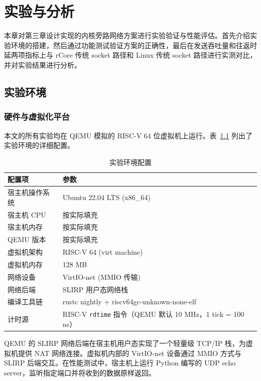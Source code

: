 \chapter{实验与分析}
\label{cha:experiment}

本章对第三章设计实现的内核旁路网络方案进行实验验证与性能评估。首先介绍实验环境的搭建，然后通过功能测试验证方案的正确性，最后在发送吞吐量和往返时延两项指标上与 rCore 传统 socket 路径和 Linux 传统 socket 路径进行实测对比，并对实验结果进行分析。

\section{实验环境}
\label{sec:env}

\subsection{硬件与虚拟化平台}

本文的所有实验均在 QEMU 模拟的 RISC-V 64 位虚拟机上运行。表~\ref{tab:env} 列出了实验环境的详细配置。

\begin{table}[htbp]
    \centering
    \caption{实验环境配置}
    \label{tab:env}
    \begin{tabular}{ll}
        \toprule
        配置项 & 参数 \\
        \midrule
        宿主机操作系统   & Ubuntu 22.04 LTS (x86\_64) \\
        宿主机 CPU       & 按实际填充 \\
        宿主机内存       & 按实际填充 \\
        QEMU 版本        & 按实际填充 \\
        虚拟机架构       & RISC-V 64 (virt machine) \\
        虚拟机内存       & 128 MB \\
        网络设备         & VirtIO-net (MMIO 传输) \\
        网络后端         & SLIRP 用户态网络栈 \\
        编译工具链       & rustc nightly + riscv64gc-unknown-none-elf \\
        计时源           & RISC-V \texttt{rdtime} 指令（QEMU 默认 10 MHz，1 tick = 100 ns）\\
        \bottomrule
    \end{tabular}
\end{table}

QEMU 的 SLIRP 网络后端在宿主机用户态实现了一个轻量级 TCP/IP 栈，为虚拟机提供 NAT 网络连接。虚拟机内部的 VirtIO-net 设备通过 MMIO 方式与 SLIRP 后端交互。在性能测试中，宿主机上运行 Python 编写的 UDP echo server，监听指定端口并将收到的数据原样返回。

